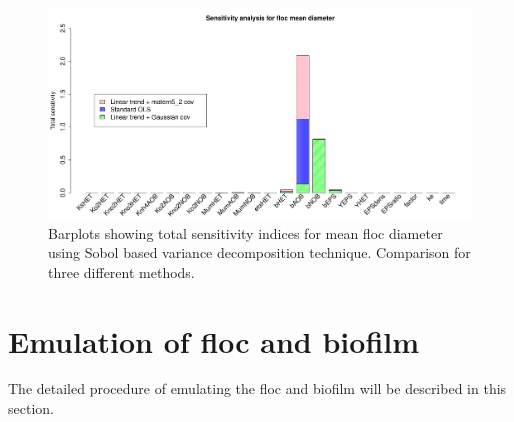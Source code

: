 \documentclass[12pt,titlepage]{report}
\theoremstyle{definition}
\theoremstyle{remark}
\begin{document}
\begin{figure}[!ht] 
\includegraphics[width=1.1\textwidth]{ana/sensitivty_results}
\caption[]{Barplots showing total sensitivity indices for mean floc diameter using Sobol based variance decomposition technique. Comparison for three different methods.}\label{sens}
\end{figure}


\chapter{Emulation of floc and biofilm}
The detailed procedure of emulating the floc and biofilm will be described in this section.
\end{document}
